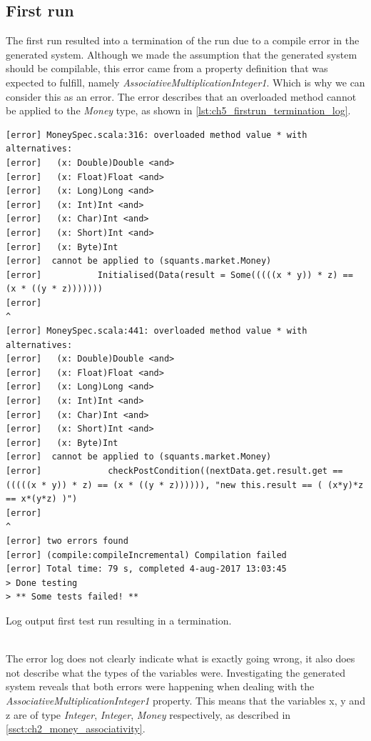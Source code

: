 \subsection{First run}
The first run resulted into a termination of the run due to a compile error in the generated system. Although we made the assumption that the generated system should be compilable, this error came from a property definition that was expected to fulfill, namely \textit{AssociativeMultiplicationInteger1}. Which is why we can consider this as an error. The error describes that an overloaded method cannot be applied to the \textit{Money} type, as shown in \autoref{lst:ch5_firstrun_termination_log}.
\\
\begin{sourcecode}[h!]
\begin{lstlisting}[language=Log]
[error] MoneySpec.scala:316: overloaded method value * with alternatives:
[error]   (x: Double)Double <and>
[error]   (x: Float)Float <and>
[error]   (x: Long)Long <and>
[error]   (x: Int)Int <and>
[error]   (x: Char)Int <and>
[error]   (x: Short)Int <and>
[error]   (x: Byte)Int
[error]  cannot be applied to (squants.market.Money)
[error]           Initialised(Data(result = Some(((((x * y)) * z) == (x * ((y * z)))))))
[error]                                                                 ^
[error] MoneySpec.scala:441: overloaded method value * with alternatives:
[error]   (x: Double)Double <and>
[error]   (x: Float)Float <and>
[error]   (x: Long)Long <and>
[error]   (x: Int)Int <and>
[error]   (x: Char)Int <and>
[error]   (x: Short)Int <and>
[error]   (x: Byte)Int
[error]  cannot be applied to (squants.market.Money)
[error]             checkPostCondition((nextData.get.result.get == (((((x * y)) * z) == (x * ((y * z)))))), "new this.result == ( (x*y)*z == x*(y*z) )")
[error]                                                                                    ^
[error] two errors found
[error] (compile:compileIncremental) Compilation failed
[error] Total time: 79 s, completed 4-aug-2017 13:03:45
> Done testing
> ** Some tests failed! **
\end{lstlisting}
\caption{Log output first test run resulting in a termination.}
\label{lst:ch5_firstrun_termination_log}
\end{sourcecode}
\\
The error log does not clearly indicate what is exactly going wrong, it also does not describe what the types of the variables were. Investigating the generated system reveals that both errors were happening when dealing with the \textit{AssociativeMultiplicationInteger1} property. This means that the variables x, y and z are of type \textit{Integer}, \textit{Integer}, \textit{Money} respectively, as described in \autoref{ssct:ch2_money_associativity}.\\
